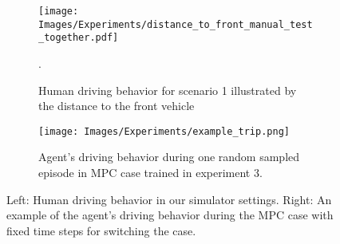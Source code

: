 \begin{figure}
    \centering
    \begin{subfigure}[t]{0.465\columnwidth}
    \centering
    \texttt{[image: Images/Experiments/distance\_to\_front\_manual\_test\_together.pdf]}
    \caption{Human driving behavior for scenario 1 illustrated by the distance to the front vehicle}.
    \label{fig:human}
    \end{subfigure} \hfill
    \begin{subfigure}[t]{0.465\columnwidth}
    \centering
        \texttt{[image: Images/Experiments/example\_trip.png]}
        \caption{Agent's driving behavior during one random sampled episode in MPC case trained in experiment 3.}
        \label{fig:example}
    \end{subfigure}
    \caption{Left: Human driving behavior in our simulator settings. Right: An example of the agent's driving behavior during the MPC case with fixed time steps for switching the case.}
\end{figure}